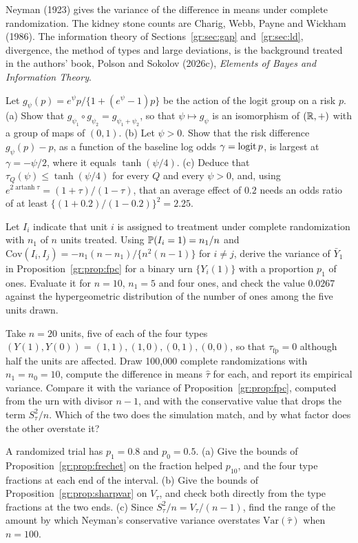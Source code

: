 Neyman (1923) gives the variance of the difference in means under complete randomization. The kidney stone counts are Charig, Webb, Payne and Wickham (1986). The information theory of Sections~\ref{gr:sec:gap} and~\ref{gr:sec:ld}, divergence, the method of types and large deviations, is the background treated in the authors' book, Polson and Sokolov (2026c), \emph{Elements of Bayes and Information Theory}. 

\begin{exercises}
\item\label{ex:gr:1} Let $g_\psi(p)=e^{\psi}p/\{1+(e^{\psi}-1)p\}$ be the action of the logit group on a risk $p$. (a) Show that $g_{\psi_1}\circ g_{\psi_2}=g_{\psi_1+\psi_2}$, so that $\psi\mapsto g_\psi$ is an isomorphism of $(\mathbb{R},+)$ with a group of maps of $(0,1)$. (b) Let $\psi>0$. Show that the risk difference $g_\psi(p)-p$, as a function of the baseline log odds $\gamma=\operatorname{logit} p$, is largest at $\gamma=-\psi/2$, where it equals $\tanh(\psi/4)$. (c) Deduce that $\tau_Q(\psi)\le\tanh(\psi/4)$ for every $Q$ and every $\psi>0$, and, using $e^{2\operatorname{artanh}\tau}=(1+\tau)/(1-\tau)$, that an average effect of $0.2$ needs an odds ratio of at least $\{(1+0.2)/(1-0.2)\}^2=2.25$.
\item\label{ex:gr:2} Let $I_i$ indicate that unit $i$ is assigned to treatment under complete randomization with $n_1$ of $n$ units treated. Using $\mathbb{P}(I_i=1)=n_1/n$ and $\mathrm{Cov}(I_i,I_j)=-n_1(n-n_1)/\{n^2(n-1)\}$ for $i\ne j$, derive the variance of $\bar Y_1$ in Proposition~\ref{gr:prop:fpc} for a binary urn $\{Y_i(1)\}$ with a proportion $p_1$ of ones. Evaluate it for $n=10$, $n_1=5$ and four ones, and check the value $0.0267$ against the hypergeometric distribution of the number of ones among the five units drawn.
\item\label{ex:gr:3} Take $n=20$ units, five of each of the four types $(Y(1),Y(0))=(1,1),(1,0),(0,1),(0,0)$, so that $\tau_{\mathrm{fp}}=0$ although half the units are affected. Draw 100,000 complete randomizations with $n_1=n_0=10$, compute the difference in means $\hat\tau$ for each, and report its empirical variance. Compare it with the variance of Proposition~\ref{gr:prop:fpc}, computed from the urn with divisor $n-1$, and with the conservative value that drops the term $S_\tau^2/n$. Which of the two does the simulation match, and by what factor does the other overstate it?
\item\label{ex:gr:4} A randomized trial has $p_1=0.8$ and $p_0=0.5$. (a) Give the bounds of Proposition~\ref{gr:prop:frechet} on the fraction helped $p_{10}$, and the four type fractions at each end of the interval. (b) Give the bounds of Proposition~\ref{gr:prop:sharpvar} on $V_\tau$, and check both directly from the type fractions at the two ends. (c) Since $S_\tau^2/n=V_\tau/(n-1)$, find the range of the amount by which Neyman's conservative variance overstates $\mathrm{Var}(\hat\tau)$ when $n=100$.

\end{exercises}
